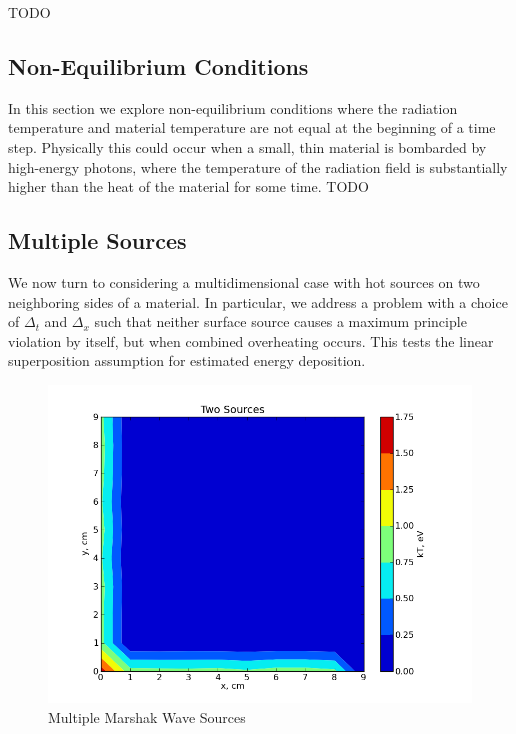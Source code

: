 TODO
				
\belowSubSecSkip

\aboveSubSecSkip

\subsection{Non-Equilibrium Conditions}
\label{sec:Results-noneq}

\noindent
	\indent In this section we explore non-equilibrium conditions where the radiation temperature and
material temperature are not equal at the beginning of a time step.  Physically this could occur when a small, thin material is bombarded by high-energy photons, where the temperature of the radiation field is substantially higher than the heat of the material for some time. TODO
				
\belowSubSecSkip

\aboveSubSecSkip

\subsection{Multiple Sources}
\label{sec:Results-multiple}

\noindent
	\indent We now turn to considering a multidimensional case with hot sources on two neighboring sides of a material.  In particular, we address a problem with a choice of $\Delta_t$ and $\Delta_x$ such that neither surface source causes a maximum principle violation by itself, but when combined overheating occurs.  This tests the linear superposition assumption for estimated energy deposition.
\begin{figure}[htb]
\centering
\includegraphics[width=\linewidth]{./graphics/2src}
\caption{Multiple Marshak Wave Sources}
\label{fig:results_2src}
\end{figure}
				
